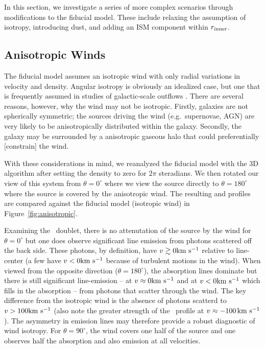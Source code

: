 \documentclass[12pt,preprint]{aastex}
\begin{document}
In this section, we investigate a series of more complex scenarios
through modifications to the fiducial model.  These include relaxing
the assumption of isotropy, introducing dust, and adding an ISM
component within $r_{\rm inner}$.

\subsection{Anisotropic Winds}
\label{sec:anisotropic}

The fiducial model assumes an
isotropic wind with only radial variations in velocity and density. 
Angular isotropy is obviously an idealized case, but
one that is frequently assumed in studies of galactic-scale outflows
\citep[e.g.][]{steidel+10}.   There are several reasons, however, why
the wind may not be isotropic.  Firstly, galaxies are not spherically
symmetric;  the sources driving the
wind (e.g.\ supernovae, AGN) are very likely to be anisotropically distributed
within the galaxy.  Secondly, the galaxy may be surrounded by a
anisotropic gaseous halo that could preferentially [constrain] the
wind. 

With these considerations in mind, we reanalyzed the fiducial model
with the 3D algorithm after setting the density to zero for $2\pi$ steradians.
We then rotated our view of this system from $\theta = 0^\circ$ where
we view the source directly to $\theta = 180^\circ$ where the source
is covered by the anisotropic wind.  The resulting  and
 profiles are compared against the fiducial model
(isotropic wind) in Figure~\ref{fig:anisotropic}.  

Examining the \mgiid\ doublet, 
there is no attenutation of the source by the wind for $\theta =
0^\circ$
but one does observe significant line emission from photons scattered
off the back side.  These photons, by definition, have $v \gtrsim 0 {\rm km~s^{-1}}$
relative to line-center (a few have $v<0 {\rm km~s^{-1}}$ because
of turbulent motions in the wind). 
When viewed from the opposite direction ($\theta = 180^\circ$), the
absorption lines dominate but there is still significant
line-emission -- at $v \approx 0 {\rm km~s^{-1}}$ and at $v < 0 {\rm km~s^{-1}}$ which fills
in the absorption -- from photons that scatter through the wind.  The
key difference from the isotropic wind is the absence of photons
scatterd to $v > 100 {\rm km~s^{-1}}$ (also note the greater strength of the
\mgiib\ profile at $v \approx -100 \, {\rm km~s^{-1}}$). The asymmetry in emission lines
may therefore provide a robust diagnostic of wind isotropy.
For $\theta = 90^\circ$, the wind covers one half of the source and
one observes half the absorption and also emission at all velocities.
\end{document}
